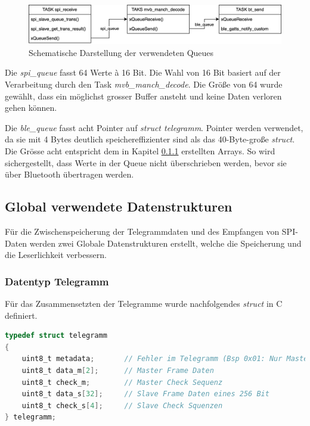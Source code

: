 \begin{figure}[H]
    \centering
    \includegraphics[width=0.9\linewidth]{Figures/Chap3/ESP/FreeRTOS/Queue.png}
    \caption{Schematische Darstellung der verwendeten Queues}
    \label{fig:QueueSchema}
\end{figure}

Die \textit{spi\_queue} fasst 64 Werte à 16 Bit. Die Wahl von 16 Bit basiert auf der Verarbeitung durch den Task \textit{mvb\_manch\_decode}. Die Größe von 64 wurde gewählt, dass ein möglichst grosser Buffer ansteht und keine Daten verloren gehen können.

Die \textit{ble\_queue} fasst acht Pointer auf \textit{struct telegramm}. Pointer werden verwendet, da sie mit 4 Bytes deutlich speichereffizienter sind als das 40-Byte-große \textit{struct}. Die Grösse acht entspricht dem in Kapitel \ref{subsub:DataTelegramm} erstellten Arrays. So wird sichergestellt, dass Werte in der Queue nicht überschrieben werden, bevor sie über Bluetooth übertragen werden.

\subsection{Global verwendete Datenstrukturen}
\label{sub:GlobalDtatStruct}
Für die Zwischenspeicherung der Telegrammdaten und des Empfangen von SPI-Daten werden zwei Globale Datenstrukturen erstellt, welche die Speicherung und die Leserlichkeit verbessern. 

\subsubsection{Datentyp Telegramm}
\label{subsub:DataTelegramm}
Für das Zusammensetzten der Telegramme wurde nachfolgendes \textit{struct} in C definiert.

\begin{lstlisting}[language=C]
typedef struct telegramm
{
    uint8_t metadata;       // Fehler im Telegramm (Bsp 0x01: Nur Master-Frame)
    uint8_t data_m[2];      // Master Frame Daten
    uint8_t check_m;        // Master Check Sequenz
    uint8_t data_s[32];     // Slave Frame Daten eines 256 Bit
    uint8_t check_s[4];     // Slave Check Squenzen
} telegramm;
\end{lstlisting}

